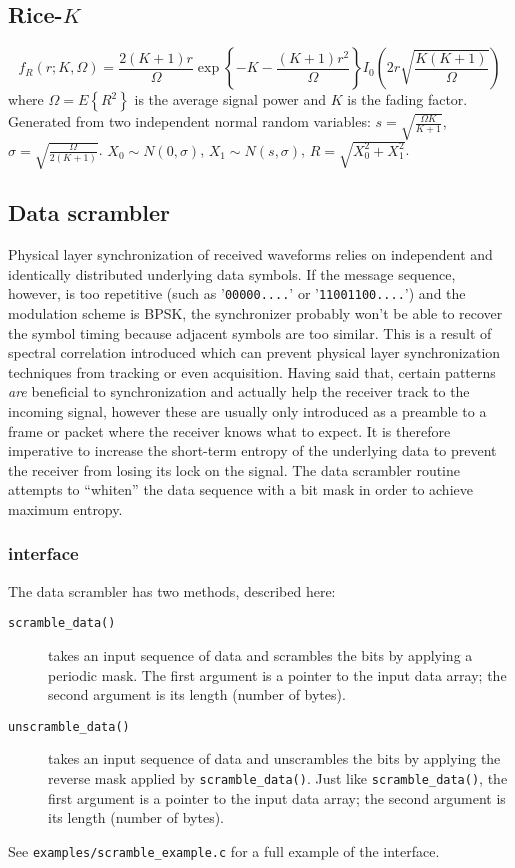 \subsection{Rice-$K$}
\[
    f_R(r;K,\Omega) = 
        \frac{2(K+1)r}{\Omega}
        \exp\left\{-K-\frac{(K+1)r^2}{\Omega}\right\}
        I_0\left( 2r\sqrt{\frac{K(K+1)}{\Omega}} \right)
\]
where $\Omega=E\left\{R^2\right\}$ is the average signal power and $K$ is the
fading factor.
Generated from two independent normal random variables:
$s = \sqrt{\frac{\Omega K}{K+1}}$,
$\sigma = \sqrt{\frac{\Omega}{2(K+1)}}$.
$X_0 \sim N(0,\sigma)$,
$X_1 \sim N(s,\sigma)$,
$R = \sqrt{X_0^2 + X_1^2}$.


\subsection{Data scrambler}
Physical layer synchronization of received waveforms relies on independent and
identically distributed underlying data symbols.
If the message sequence, however, is too repetitive
(such as '{\tt 00000....}' or '{\tt 11001100....}')
and the modulation scheme is BPSK, the synchronizer probably won't be able to
recover the symbol timing because adjacent symbols are too similar.
This is a result of spectral correlation introduced which can prevent physical
layer synchronization techniques from tracking or even acquisition.
Having said that, certain patterns {\em are} beneficial to synchronization and
actually help the receiver track to the incoming signal, however these are
usually only introduced as a preamble to a frame or packet where the receiver
knows what to expect.
It is therefore imperative to increase the short-term entropy of the
underlying data to prevent the receiver from losing its lock on the signal.
The data scrambler routine attempts to ``whiten'' the data sequence with a bit
mask in order to achieve maximum entropy.

\subsubsection{interface}
The data scrambler has two methods, described here:
\begin{description}
\item[{\tt scramble\_data()}]
    takes an input sequence of data and scrambles the bits by applying a
    periodic mask.
    The first argument is a pointer to the input data array; the second
    argument is its length (number of bytes).
\item[{\tt unscramble\_data()}]
    takes an input sequence of data and unscrambles the bits by applying the
    reverse mask applied by {\tt scramble\_data()}.
    Just like {\tt scramble\_data()}, the first argument is a pointer to the
    input data array; the second argument is its length (number of bytes).
\end{description}

See {\tt examples/scramble\_example.c} for a full example of the interface.

